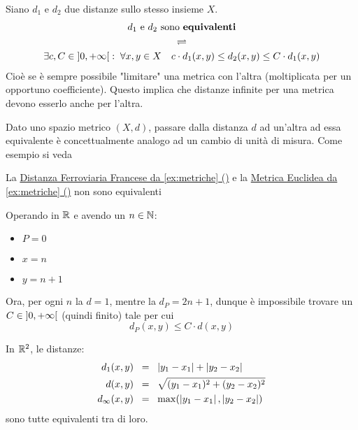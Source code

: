 \begin{definition}
	\label{def:metr_equiv}
	Siano $d_1$ e $d_2$ due distanze sullo stesso insieme $X$.
	\begin{equation*}
		\begin{gathered}
			d_1 \text{ e } d_2 \text{ sono \textbf{equivalenti}}\\
			\rightleftharpoons\\
			\exists c,C \in \left]0,+\infty\right[:\; \forall x,y \in X \quad c \cdot d_1(x,y) \leq d_2 (x,y) \leq C \cdot d_1 (x,y)
		\end{gathered}
	\end{equation*}
	Cioè se è sempre possibile "limitare" una metrica con l'altra (moltiplicata per un opportuno coefficiente). Questo implica che distanze infinite per una metrica devono esserlo anche per l'altra.
	\begin{note}
		Dato uno spazio metrico $(X,d)$, passare dalla distanza $d$ ad un'altra ad essa equivalente è concettualmente analogo ad un cambio di unità di misura. Come esempio si veda 
	\end{note}
\end{definition}
\begin{example}
	La \hyperref[ex:dist_parigi]{Distanza Ferroviaria Francese da \cref*{ex:metriche} ()} e la \hyperref[ex:dist_eucl]{Metrica Euclidea da \cref*{ex:metriche} ()} non sono equivalenti
	\begin{solution}
		Operando in $\mathbb{R}$ e avendo un $n \in \mathbb{N}$:
		\begin{itemize}
			\item $P = 0$
			\item $x = n$
			\item $y = n+1$
		\end{itemize}
		Ora, per ogni $n$ la $d = 1$, mentre la $d_P = 2n+1$, dunque è impossibile trovare un $C \in \left]0,+\infty\right[$ (quindi finito) tale per cui
		\[d_P(x,y) \leq C \cdot d(x,y)\]
	\end{solution}
\end{example}
\begin{example}
	\label{ex:metr_equiv_R2}
	In $\mathbb{R}^2$, le distanze:
	\begin{align*}
		d_1(x,y) \;\; &= \;\; \left|y_1 - x_1\right| + \left|y_2 - x_2\right|\\
		d(x,y) \;\; &= \;\; \sqrt{(y_1 - x_1)^2 + (y_2 - x_2)^2}\\
		d_\infty(x,y) \;\; &= \;\; \max (\left|y_1 - x_1\right|, \left|y_2 - x_2\right|)
	\end{align*}
	sono tutte equivalenti tra di loro.
\end{example}

